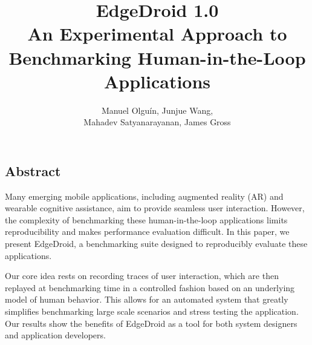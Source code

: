 \documentclass[portrait, a1]{KTHEEposter}
\begin{document}
\title{\Huge{\bfseries EdgeDroid 1.0}\\\normalfont\LARGE An Experimental Approach to Benchmarking Human-in-the-Loop Applications}

\author{\Large Manuel Olguín, Junjue Wang,\\Mahadev Satyanarayanan, James Gross}
\maketitle

\begin{pcolumns}[3]
    \begin{pcolumn}[2]
        \begin{pframe}[.75]
            \section{Abstract}
            Many emerging mobile applications, including augmented reality (AR) and wearable cognitive assistance, aim to provide seamless user interaction.
            However, the complexity of benchmarking these human-in-the-loop applications limits reproducibility and makes performance evaluation difficult. In this paper, we present EdgeDroid, a benchmarking suite designed to reproducibly evaluate these applications.

            Our core idea rests on recording traces of user interaction, which are then replayed at benchmarking time in a controlled fashion based on an underlying model of human behavior.
            This allows for an automated system that greatly simplifies benchmarking large scale scenarios and stress testing the application.
            Our results show the benefits of EdgeDroid as a tool for both system designers and application developers.
        \end{pframe}
        \begin{pframe}[1.25]

\end{pframe}
\end{pcolumn}
\end{pcolumns}
\end{document}
